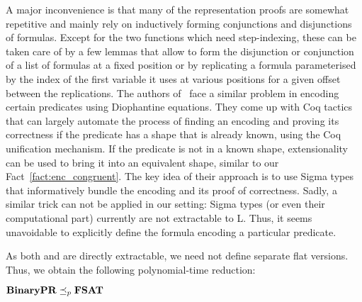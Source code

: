 A major inconvenience is that many of the representation proofs are somewhat repetitive and mainly rely on inductively forming conjunctions and disjunctions of formulas. Except for the two functions which need step-indexing, these can be taken care of by a few lemmas that allow to form the disjunction or conjunction of a list of formulas at a fixed position or by replicating a formula parameterised by the index of the first variable it uses at various positions for a given offset between the replications. 
The authors of~\cite{Larchey-WendlingForster:2019:H10_in_Coq} face a similar problem in encoding certain predicates using Diophantine equations. They come up with Coq tactics that can largely automate the process of finding an encoding and proving its correctness if the predicate has a shape that is already known, using the Coq unification mechanism. If the predicate is not in a known shape, extensionality can be used to bring it into an equivalent shape, similar to our Fact~\ref{fact:enc_congruent}.
The key idea of their approach is to use Sigma types that informatively bundle the encoding and its proof of correctness. 
Sadly, a similar trick can not be applied in our setting: Sigma types (or even their computational part) currently are not extractable to L. Thus, it seems unavoidable to explicitly define the formula encoding a particular predicate.

As both \BPR{} and \fsat{} are directly extractable, we need not define separate flat versions. Thus, we obtain the following polynomial-time reduction:
\begin{theorem}
  $\normalfont\textbf{BinaryPR}{} \preceq_p{} \normalfont\textbf{FSAT}{}$
\end{theorem}
